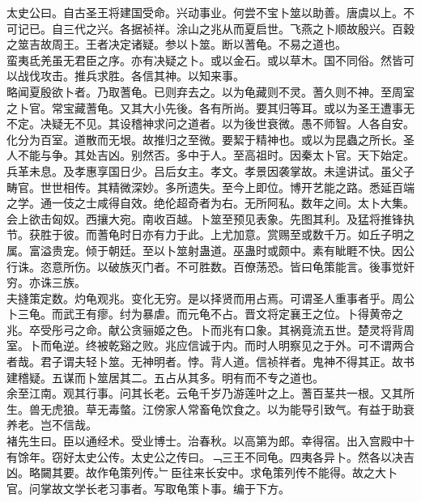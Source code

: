 \documentclass{zhvt-classic}
\begin{document}

\hspace*{2em}太史公曰。自古圣王将建国受命。兴动事业。何尝不宝卜筮以助善。唐虞以上。不可记已。自三代之兴。各据祯祥。涂山之兆从而夏启世。飞燕之卜顺故殷兴。百穀之筮吉故周王。王者决定诸疑。参以卜筮。断以蓍龟。不易之道也。\\
\hspace*{2em}蛮夷氐羌虽无君臣之序。亦有决疑之卜。或以金石。或以草木。国不同俗。然皆可以战伐攻击。推兵求胜。各信其神。以知来事。\\
\hspace*{2em}略闻夏殷欲卜者。乃取蓍龟。已则弃去之。以为龟藏则不灵。蓍久则不神。至周室之卜官。常宝藏蓍龟。又其大小先後。各有所尚。要其归等耳。或以为圣王遭事无不定。决疑无不见。其设稽神求问之道者。以为後世衰微。愚不师智。人各自安。化分为百室。道散而无垠。故推归之至微。要絜于精神也。或以为昆蟲之所长。圣人不能与争。其处吉凶。别然否。多中于人。至高祖时。因秦太卜官。天下始定。兵革未息。及孝惠享国日少。吕后女主。孝文。孝景因袭掌故。未遑讲试。虽父子畴官。世世相传。其精微深妙。多所遗失。至今上即位。博开艺能之路。悉延百端之学。通一伎之士咸得自效。绝伦超奇者为右。无所阿私。数年之间。太卜大集。会上欲击匈奴。西攘大宛。南收百越。卜筮至预见表象。先图其利。及猛将推锋执节。获胜于彼。而蓍龟时日亦有力于此。上尤加意。赏赐至或数千万。如丘子明之属。富溢贵宠。倾于朝廷。至以卜筮射蛊道。巫蛊时或颇中。素有眦睚不快。因公行诛。恣意所伤。以破族灭门者。不可胜数。百僚荡恐。皆曰龟策能言。後事觉奸穷。亦诛三族。\\
\hspace*{2em}夫摓策定数。灼龟观兆。变化无穷。是以择贤而用占焉。可谓圣人重事者乎。周公卜三龟。而武王有瘳。纣为暴虐。而元龟不占。晋文将定襄王之位。卜得黄帝之兆。卒受彤弓之命。献公贪骊姬之色。卜而兆有口象。其祸竟流五世。楚灵将背周室。卜而龟逆。终被乾谿之败。兆应信诚于内。而时人明察见之于外。可不谓两合者哉。君子谓夫轻卜筮。无神明者。悖。背人道。信祯祥者。鬼神不得其正。故书建稽疑。五谋而卜筮居其二。五占从其多。明有而不专之道也。\\
\hspace*{2em}余至江南。观其行事。问其长老。云龟千岁乃游莲叶之上。蓍百茎共一根。又其所生。兽无虎狼。草无毒螫。江傍家人常畜龟饮食之。以为能导引致气。有益于助衰养老。岂不信哉。\\
\hspace*{2em}褚先生曰。臣以通经术。受业博士。治春秋。以高第为郎。幸得宿。出入宫殿中十有馀年。窃好太史公传。太史公之传曰。﹁三王不同龟。四夷各异卜。然各以决吉凶。略闚其要。故作龟策列传。﹂臣往来长安中。求龟策列传不能得。故之大卜官。问掌故文学长老习事者。写取龟策卜事。编于下方。\\
\end{document}
